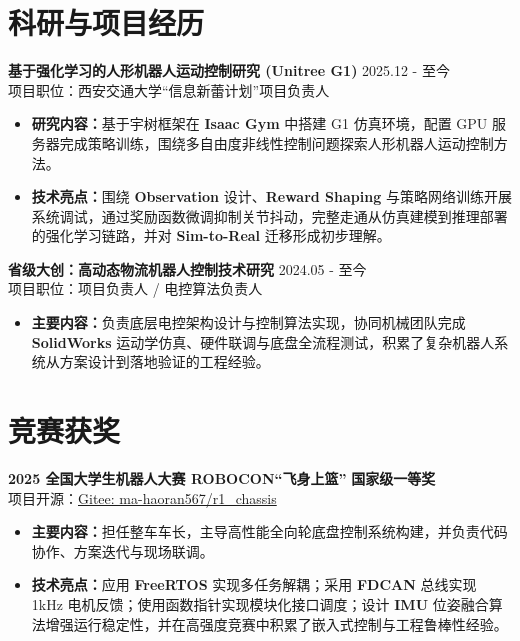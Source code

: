 \documentclass[11pt,a4paper]{article}
\begin{document}
\section{科研与项目经历}
\textbf{基于强化学习的人形机器人运动控制研究 (Unitree G1)} \hfill 2025.12 - 至今 \\
{\small 项目职位：西安交通大学“信息新蕾计划”项目负责人}
\begin{itemize}[leftmargin=1.5em, noitemsep, topsep=2pt]
    \item \textbf{研究内容：}基于宇树框架在 \textbf{Isaac Gym} 中搭建 G1 仿真环境，配置 GPU 服务器完成策略训练，围绕多自由度非线性控制问题探索人形机器人运动控制方法。
    \item \textbf{技术亮点：}围绕 \textbf{Observation} 设计、\textbf{Reward Shaping} 与策略网络训练开展系统调试，通过奖励函数微调抑制关节抖动，完整走通从仿真建模到推理部署的强化学习链路，并对 \textbf{Sim-to-Real} 迁移形成初步理解。
\end{itemize}



\textbf{省级大创：高动态物流机器人控制技术研究} \hfill 2024.05 - 至今 \\
{\small 项目职位：项目负责人 / 电控算法负责人}
\begin{itemize}[leftmargin=1.5em, noitemsep, topsep=2pt]
    \item \textbf{主要内容：}负责底层电控架构设计与控制算法实现，协同机械团队完成 \textbf{SolidWorks} 运动学仿真、硬件联调与底盘全流程测试，积累了复杂机器人系统从方案设计到落地验证的工程经验。
\end{itemize}

\section{竞赛获奖}
\textbf{2025 全国大学生机器人大赛 ROBOCON“飞身上篮”} \hfill \textbf{国家级一等奖} \\
{\small 项目开源：\href{https://gitee.com/ma-haoran567/r1_chassis}{Gitee: ma-haoran567/r1\_chassis}}
\begin{itemize}[leftmargin=1.5em, noitemsep, topsep=2pt]
    \item \textbf{主要内容：}担任整车车长，主导高性能全向轮底盘控制系统构建，并负责代码协作、方案迭代与现场联调。
    \item \textbf{技术亮点：}应用 \textbf{FreeRTOS} 实现多任务解耦；采用 \textbf{FDCAN} 总线实现 1kHz 电机反馈；使用函数指针实现模块化接口调度；设计 \textbf{IMU} 位姿融合算法增强运行稳定性，并在高强度竞赛中积累了嵌入式控制与工程鲁棒性经验。
\end{itemize}
\end{document}
